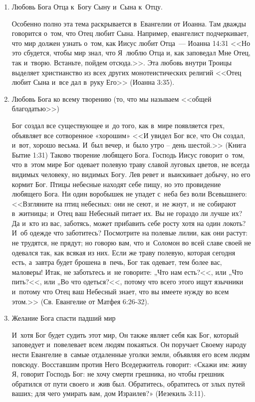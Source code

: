 \documentclass[a4paper,12pt]{article}
\begin{document}
\begin{enumerate}

    \item Любовь Бога Отца к~Богу Сыну и~Сына к~Отцу.

            Особенно полно эта тема раскрывается в~Евангелии от Иоанна. Там дважды говорится о~том, что Отец любит Сына. Например, евангелист подчеркивает, что мир должен узнать о~том, как Иисус любит Отца~--- Иоанна 14:31 <<Но это сбудется, чтобы мир знал, что Я~люблю Отца и, как заповедал Мне Отец, так и~творю. Встаньте, пойдем отсюда.>>. Эта любовь внутри Троицы выделяет христианство из всех других монотеистических религий <<Отец любит Сына и~все дал в~руку Его>> (Иоанна 3:35).

        \item Любовь Бога ко всему творению (то, что мы называем <<общей благодатью>>)
        
            Бог создал все существующее и~до того, как в~мире появляется грех, объявляет все сотворенное «хорошим» <<И увидел Бог все, что Он создал, и~вот, хорошо весьма. И~был вечер, и~было утро – день шестой.>> (Книга Бытие 1:31) Таково творение любящего Бога. Господь Иисус говорит о~том, что в~этом мире Бог одевает полевую траву славой луговых цветов, не всегда видимых человеку, но видимых Богу. Лев ревет и~выискивает добычу, но его кормит Бог. Птицы небесные находят себе пищу, но это провидение любящего Бога. Ни один воробышек не упадет с~неба без воли Всевышнего: <<Взгляните на птиц небесных: они не сеют, и~не жнут, и~не собирают в~житницы; и~Отец ваш Небесный питает их. Вы не гораздо ли лучше их? Да и~кто из вас, заботясь, может прибавить себе росту хотя на один локоть? И~об одежде что заботитесь? Посмотрите на полевые лилии, как они растут: не трудятся, не прядут; но говорю вам, что и~Соломон во всей славе своей не одевался так, как всякая из них. Если же траву полевую, которая сегодня есть, а~завтра будет брошена в~печь, Бог так одевает, тем более вас, маловеры! Итак, не заботьтесь и~не говорите: „Что нам есть?<<, или „Что пить?<<, или „Во что одеться?<<, потому что всего этого ищут язычники и~потому что Отец ваш Небесный знает, что вы имеете нужду во всем этом.>> (Св. Евангелие от Матфея 6:26-32).
        
        \item Желание Бога спасти падший мир
        
            И~хотя Бог будет судить этот мир, Он также являет себя как Бог, который заповедует и~повелевает всем людям покаяться. Он поручает Своему народу нести Евангелие в~самые отдаленные уголки земли, объявляя его всем людям повсюду. Восставшим против Него Вседержитель говорит: «Скажи им: живу Я, говорит Господь Бог: не хочу смерти грешника, но чтобы грешник обратился от пути своего и~жив был. Обратитесь, обратитесь от злых путей ваших; для чего умирать вам, дом Израилев?» (Иезекиль 3:11).	


\end{enumerate}
\end{document}
